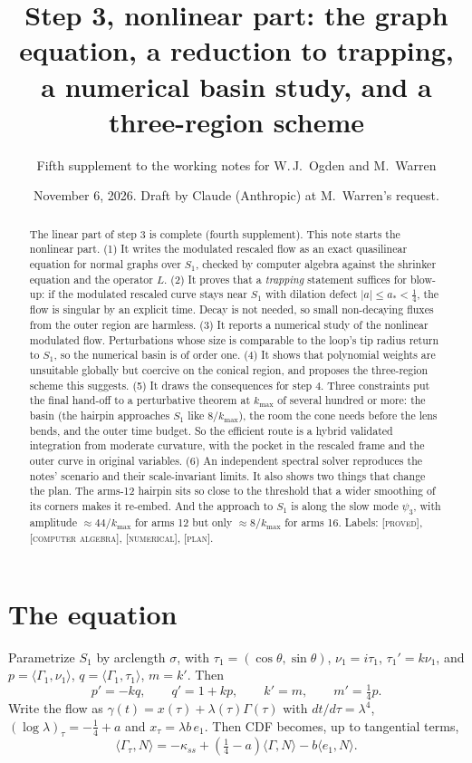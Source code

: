 \documentclass[11pt]{amsart}
\title[Step 3, nonlinear part]{Step 3, nonlinear part: the graph equation, a reduction to trapping,\\ a numerical basin study, and a three-region scheme}
\author[Fifth supplement]{Fifth supplement to the working notes for W.\,J.~Ogden and M.~Warren}
\date{November 6, 2026. Draft by Claude (Anthropic) at M.~Warren's request.}
\theoremstyle{remark}
\newcommand{\ip}[2]{\langle #1,#2\rangle}
\newcommand{\lab}[1]{\textup{\textsc{[#1]}}}
\begin{document}
\begin{abstract}
The linear part of step 3 is complete (fourth supplement). This note starts the nonlinear part. (1) It writes the modulated rescaled flow as an exact quasilinear equation for normal graphs over $S_1$, checked by computer algebra against the shrinker equation and the operator $L$. (2) It proves that a \emph{trapping} statement suffices for blow-up: if the modulated rescaled curve stays near $S_1$ with dilation defect $|a|\le a_*<\frac14$, the flow is singular by an explicit time. Decay is not needed, so small non-decaying fluxes from the outer region are harmless. (3) It reports a numerical study of the nonlinear modulated flow. Perturbations whose size is comparable to the loop's tip radius return to $S_1$, so the numerical basin is of order one. (4) It shows that polynomial weights are unsuitable globally but coercive on the conical region, and proposes the three-region scheme this suggests. (5) It draws the consequences for step 4. Three constraints put the final hand-off to a perturbative theorem at $k_{\max}$ of several hundred or more: the basin (the hairpin approaches $S_1$ like $8/k_{\max}$), the room the cone needs before the lens bends, and the outer time budget. So the efficient route is a hybrid validated integration from moderate curvature, with the pocket in the rescaled frame and the outer curve in original variables. (6) An independent spectral solver reproduces the notes' scenario and their scale-invariant limits. It also shows two things that change the plan. The arms-12 hairpin sits so close to the threshold that a wider smoothing of its corners makes it re-embed. And the approach to $S_1$ is along the slow mode $\psi_3$, with amplitude $\approx44/k_{\max}$ for arms 12 but only $\approx8/k_{\max}$ for arms 16. Labels: \lab{proved}, \lab{computer algebra}, \lab{numerical}, \lab{plan}.
\end{abstract}
\maketitle

\section{The equation}

Parametrize $S_1$ by arclength $\sigma$, with $\tau_1=(\cos\theta,\sin\theta)$, $\nu_1=i\tau_1$, $\tau_1'=k\nu_1$, and $p=\ip{\Gamma_1}{\nu_1}$, $q=\ip{\Gamma_1}{\tau_1}$, $m=k'$. Then
\[
p'=-kq,\qquad q'=1+kp,\qquad k'=m,\qquad m'=\tfrac14p .
\]
Write the flow as $\gamma(t)=x(\tau)+\lambda(\tau)\Gamma(\tau)$ with $dt/d\tau=\lambda^4$, $(\log\lambda)_\tau=-\frac14+a$ and $x_\tau=\lambda b\,e_1$. Then CDF becomes, up to tangential terms,
\begin{equation}\label{eq:resc}
\ip{\Gamma_\tau}{N}=-\kappa_{ss}+(\tfrac14-a)\ip{\Gamma}{N}-b\ip{e_1}{N}.
\end{equation}
\end{document}

